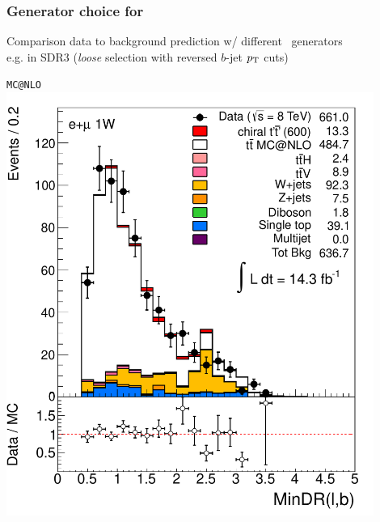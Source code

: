 \begin{frame}\frametitle{Generator choice for \ttbar}
\centering\footnotesize

Comparison data to background prediction w/ different \ttbar\ generators\\
e.g. in SDR3 ({\sl loose} selection with reversed $b$-jet $\pt$ cuts)\\
\myskip

\begin{minipage}{.33\textwidth}\centering
\texttt{MC@NLO}\\
\includegraphics[width=0.9\textwidth]{pics/wbxgen/ttbar5200/VLQAna_WbX_MinDRlb_ELEMUONCR2_1W_NOMINAL}


\end{minipage}
\end{frame}
